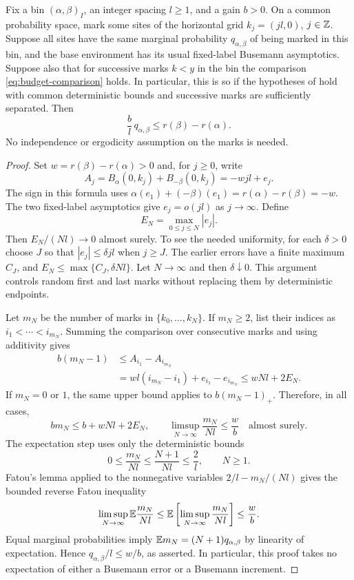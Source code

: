 \begin{proposition}\label{prop:label-budget}
Fix a bin $(\alpha,\beta)_I$, an integer spacing $l\ge1$, and a gain
$b>0$.  On a common probability space, mark some sites of the horizontal
grid $k_j=(jl,0)$, $j\in\mathbb Z$.  Suppose all sites have the same marginal
probability $q_{\alpha,\beta}$ of being marked in this bin, and the base
environment has its usual fixed-label Busemann asymptotics.  Suppose also
that for successive marks $k<y$ in the bin the comparison
\eqref{eq:budget-comparison} holds.  In particular, this is so if the
hypotheses of  hold with common deterministic
bounds and successive marks are sufficiently separated.  Then
\begin{equation}\label{eq:label-budget}
 \frac{b}{l}\,q_{\alpha,\beta}
 \le r(\beta)-r(\alpha).
\end{equation}
No independence or ergodicity assumption on the marks is needed.
\end{proposition}

\begin{proof}
Set $w=r(\beta)-r(\alpha)>0$ and, for $j\ge0$, write
\[
 A_j=B_\alpha(0,k_j)+B_{-\beta}(0,k_j)
     =-wjl+e_j.
\]
The sign in this formula uses
$\alpha(e_1)+(-\beta)(e_1)=r(\alpha)-r(\beta)=-w$.
The two fixed-label asymptotics give $e_j=o(jl)$ as $j\to\infty$.
Define
\[
 E_N=\max_{0\le j\le N}|e_j|.
\]
Then $E_N/(Nl)\to0$ almost surely.  To see the needed uniformity, for
each $\delta>0$ choose $J$ so that $|e_j|\le\delta jl$ when $j\ge J$.
The earlier errors have a finite maximum $C_J$, and
$E_N\le\max\{C_J,\delta Nl\}$.  Let $N\to\infty$ and then
$\delta\downarrow0$.  This argument controls random first and last marks
without replacing them by deterministic endpoints.

Let $m_N$ be the number of marks in $\{k_0,\ldots,k_N\}$.  If
$m_N\ge2$, list their indices as $i_1<\cdots<i_{m_N}$.  Summing the
comparison over consecutive marks and using additivity gives
\[
 \begin{split}
 b(m_N-1)
 &\le A_{i_1}-A_{i_{m_N}}\\
 &=wl(i_{m_N}-i_1)+e_{i_1}-e_{i_{m_N}}
 \le wNl+2E_N.
 \end{split}
\]
If $m_N=0$ or $1$, the same upper bound applies to
$b(m_N-1)_+$.  Therefore, in all cases,
\begin{equation}\label{eq:bounded-budget-count}
 bm_N\le b+wNl+2E_N,
 \qquad
 \limsup_{N\to\infty}\frac{m_N}{Nl}\le\frac wb
 \quad\text{almost surely}.
\end{equation}
The expectation step uses only the deterministic bounds
\[
 0\le\frac{m_N}{Nl}\le\frac{N+1}{Nl}\le\frac2l,
 \qquad N\ge1.
\]
Fatou's lemma applied to the nonnegative variables
$2/l-m_N/(Nl)$ gives the bounded reverse Fatou inequality
\[
 \limsup_{N\to\infty}\mathbb E\frac{m_N}{Nl}
 \le\mathbb E\left[\limsup_{N\to\infty}\frac{m_N}{Nl}\right]
 \le\frac wb.
\]
Equal marginal probabilities imply
$\mathbb E m_N=(N+1)q_{\alpha,\beta}$ by linearity of expectation.  Hence
$q_{\alpha,\beta}/l\le w/b$, as asserted.  In particular, this proof
takes no expectation of either a Busemann error or a Busemann increment.
\end{proof}

